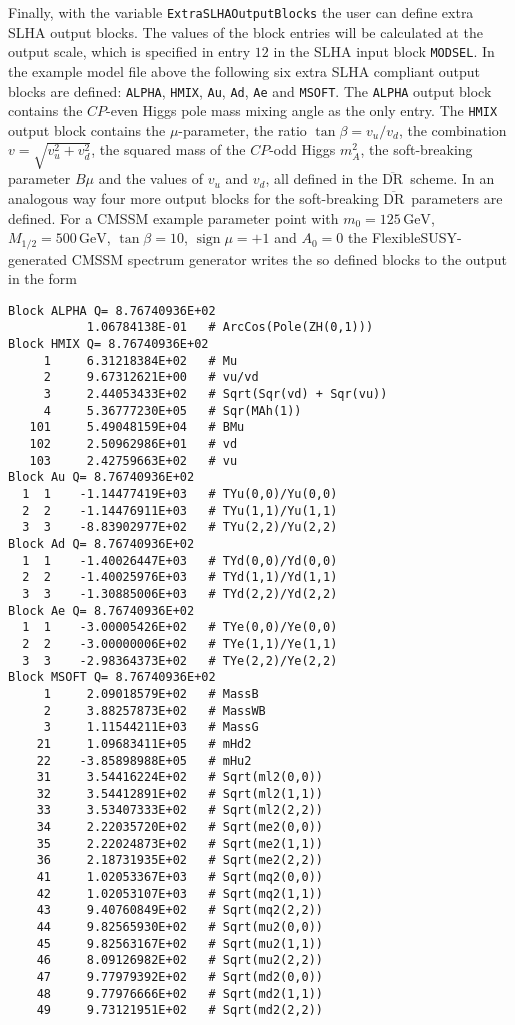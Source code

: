 \documentclass[final,3p,11pt,pdflatex]{elsarticle}
\makeatletter
\newcommand{\fs}{FlexibleSUSY\@\xspace}
\newcommand{\code}[1]{\lstinline|#1|}  %
\newcommand{\textoverline}[1]{$\overline{\mbox{#1}}$}
\newcommand{\DRbar}{\textoverline{DR}\xspace}
\newcommand{\unit}[1]{\,\text{#1}}      %
\DeclareMathOperator{\sign}{sign}
\makeatother
\begin{document}
Finally, with the variable \code{ExtraSLHAOutputBlocks} the user can
define extra SLHA output blocks.  The values of the block entries will
be calculated at the output scale, which is specified in entry $12$ in
the SLHA input block \code{MODSEL}.  In the example model file above
the following six extra SLHA compliant output blocks are defined:
\code{ALPHA}, \code{HMIX}, \code{Au}, \code{Ad}, \code{Ae} and
\code{MSOFT}.  The \code{ALPHA} output block contains the $CP$-even
Higgs pole mass mixing angle as the only entry.  The \code{HMIX}
output block contains the $\mu$-parameter, the ratio $\tan\beta =
v_u/v_d$, the combination $v=\sqrt{v_u^2 + v_d^2}$, the squared mass
of the $CP$-odd Higgs $m_A^2$, the soft-breaking parameter $B\mu$ and
the values of $v_u$ and $v_d$, all defined in the \DRbar\ scheme.  In
an analogous way four more output blocks for the soft-breaking \DRbar\
parameters are defined.  For a CMSSM example parameter point with $m_0
= 125\unit{GeV}$, $M_{1/2} = 500\unit{GeV}$, $\tan\beta = 10$,
$\sign\mu = +1$ and $A_0 = 0$ the \fs-generated CMSSM spectrum
generator writes the so defined blocks to the output in the form
%
\begin{lstlisting}
Block ALPHA Q= 8.76740936E+02
           1.06784138E-01   # ArcCos(Pole(ZH(0,1)))
Block HMIX Q= 8.76740936E+02
     1     6.31218384E+02   # Mu
     2     9.67312621E+00   # vu/vd
     3     2.44053433E+02   # Sqrt(Sqr(vd) + Sqr(vu))
     4     5.36777230E+05   # Sqr(MAh(1))
   101     5.49048159E+04   # BMu
   102     2.50962986E+01   # vd
   103     2.42759663E+02   # vu
Block Au Q= 8.76740936E+02
  1  1    -1.14477419E+03   # TYu(0,0)/Yu(0,0)
  2  2    -1.14476911E+03   # TYu(1,1)/Yu(1,1)
  3  3    -8.83902977E+02   # TYu(2,2)/Yu(2,2)
Block Ad Q= 8.76740936E+02
  1  1    -1.40026447E+03   # TYd(0,0)/Yd(0,0)
  2  2    -1.40025976E+03   # TYd(1,1)/Yd(1,1)
  3  3    -1.30885006E+03   # TYd(2,2)/Yd(2,2)
Block Ae Q= 8.76740936E+02
  1  1    -3.00005426E+02   # TYe(0,0)/Ye(0,0)
  2  2    -3.00000006E+02   # TYe(1,1)/Ye(1,1)
  3  3    -2.98364373E+02   # TYe(2,2)/Ye(2,2)
Block MSOFT Q= 8.76740936E+02
     1     2.09018579E+02   # MassB
     2     3.88257873E+02   # MassWB
     3     1.11544211E+03   # MassG
    21     1.09683411E+05   # mHd2
    22    -3.85898988E+05   # mHu2
    31     3.54416224E+02   # Sqrt(ml2(0,0))
    32     3.54412891E+02   # Sqrt(ml2(1,1))
    33     3.53407333E+02   # Sqrt(ml2(2,2))
    34     2.22035720E+02   # Sqrt(me2(0,0))
    35     2.22024873E+02   # Sqrt(me2(1,1))
    36     2.18731935E+02   # Sqrt(me2(2,2))
    41     1.02053367E+03   # Sqrt(mq2(0,0))
    42     1.02053107E+03   # Sqrt(mq2(1,1))
    43     9.40760849E+02   # Sqrt(mq2(2,2))
    44     9.82565930E+02   # Sqrt(mu2(0,0))
    45     9.82563167E+02   # Sqrt(mu2(1,1))
    46     8.09126982E+02   # Sqrt(mu2(2,2))
    47     9.77979392E+02   # Sqrt(md2(0,0))
    48     9.77976666E+02   # Sqrt(md2(1,1))
    49     9.73121951E+02   # Sqrt(md2(2,2))
\end{lstlisting}
\end{document}
